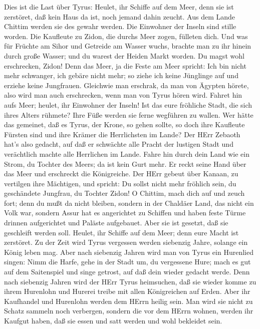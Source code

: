  Dies ist die Last über Tyrus: Heulet, ihr Schiffe auf dem
Meer, denn sie ist zerstöret, daß kein Haus da ist, noch jemand dahin
zeucht. Aus dem Lande Chittim werden sie des gewahr werden. 
Die Einwohner der Inseln sind stille worden. Die Kaufleute zu Zidon, die
durchs Meer zogen, fülleten dich.  Und was für Früchte am
Sihor und Getreide am Wasser wuchs, brachte man zu ihr hinein durch
große Wasser; und du warest der Heiden Markt worden.  Du
magst wohl erschrecken, Zidon! Denn das Meer, ja die Feste am Meer
spricht: Ich bin nicht mehr schwanger, ich gebäre nicht mehr; so ziehe
ich keine Jünglinge auf und erziehe keine Jungfrauen. 
Gleichwie man erschrak, da man von Ägypten hörete, also wird man auch
erschrecken, wenn man von Tyrus hören wird.  Fahret hin aufs
Meer; heulet, ihr Einwohner der Inseln!  Ist das eure
fröhliche Stadt, die sich ihres Alters rühmete? Ihre Füße werden sie
ferne wegführen zu wallen.  Wer hätte das gemeinet, daß es
Tyrus, der Krone, so gehen sollte, so doch ihre Kaufleute Fürsten sind
und ihre Krämer die Herrlichsten im Lande?  Der HErr Zebaoth
hat's also gedacht, auf daß er schwächte alle Pracht der lustigen Stadt
und verächtlich machte alle Herrlichen im Lande.  Fahre hin
durch dein Land wie ein Strom, du Tochter des Meers; da ist kein Gurt
mehr.  Er reckt seine Hand über das Meer und erschreckt die
Königreiche. Der HErr gebeut über Kanaan, zu vertilgen ihre Mächtigen,
 und spricht: Du sollst nicht mehr fröhlich sein, du
geschändete Jungfrau, du Tochter Zidon! O Chittim, mach dich auf und
zeuch fort; denn du mußt da nicht bleiben,  sondern in der
Chaldäer Land, das nicht ein Volk war, sondern Assur hat es angerichtet
zu Schiffen und haben feste Türme drinnen aufgerichtet und Paläste
aufgebauet. Aber sie ist gesetzt, daß sie geschleift werden soll.
 Heulet, ihr Schiffe auf dem Meer; denn eure Macht ist
zerstöret.  Zu der Zeit wird Tyrus vergessen werden
siebenzig Jahre, solange ein König leben mag. Aber nach siebenzig Jahren
wird man von Tyrus ein Hurenlied singen:  Nimm die Harfe,
gehe in der Stadt um, du vergessene Hure; mach es gut auf dem
Saitenspiel und singe getrost, auf daß dein wieder gedacht werde.
 Denn nach siebenzig Jahren wird der HErr Tyrus heimsuchen,
daß sie wieder komme zu ihrem Hurenlohn und Hurerei treibe mit allen
Königreichen auf Erden.  Aber ihr Kaufhandel und Hurenlohn
werden dem HErrn heilig sein. Man wird sie nicht zu Schatz sammeln noch
verbergen, sondern die vor dem HErrn wohnen, werden ihr Kaufgut haben,
daß sie essen und satt werden und wohl bekleidet sein.

